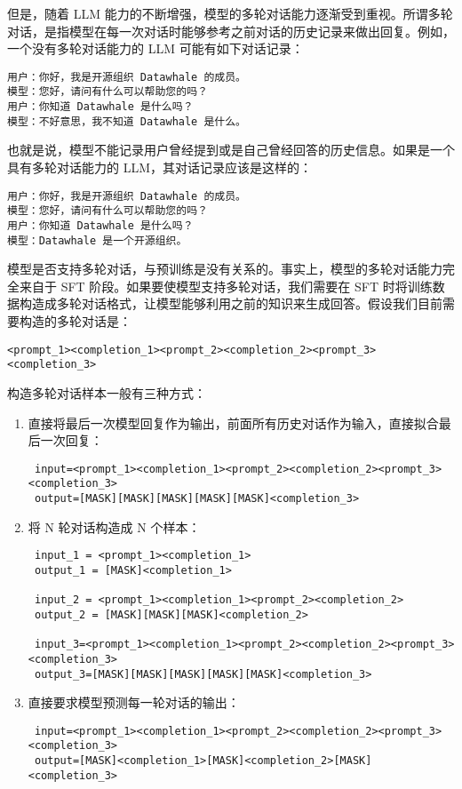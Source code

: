 \documentclass[12pt,a4paper]{book}
\begin{document}
但是，随着 LLM
能力的不断增强，模型的多轮对话能力逐渐受到重视。所谓多轮对话，是指模型在每一次对话时能够参考之前对话的历史记录来做出回复。例如，一个没有多轮对话能力的
LLM 可能有如下对话记录：

\begin{verbatim}
用户：你好，我是开源组织 Datawhale 的成员。
模型：您好，请问有什么可以帮助您的吗？
用户：你知道 Datawhale 是什么吗？
模型：不好意思，我不知道 Datawhale 是什么。
\end{verbatim}

也就是说，模型不能记录用户曾经提到或是自己曾经回答的历史信息。如果是一个具有多轮对话能力的
LLM，其对话记录应该是这样的：

\begin{verbatim}
用户：你好，我是开源组织 Datawhale 的成员。
模型：您好，请问有什么可以帮助您的吗？
用户：你知道 Datawhale 是什么吗？
模型：Datawhale 是一个开源组织。
\end{verbatim}

模型是否支持多轮对话，与预训练是没有关系的。事实上，模型的多轮对话能力完全来自于
SFT 阶段。如果要使模型支持多轮对话，我们需要在 SFT
时将训练数据构造成多轮对话格式，让模型能够利用之前的知识来生成回答。假设我们目前需要构造的多轮对话是：

\begin{verbatim}
<prompt_1><completion_1><prompt_2><completion_2><prompt_3><completion_3>
\end{verbatim}

构造多轮对话样本一般有三种方式：

\begin{enumerate}
\def\labelenumi{\arabic{enumi}.}
\item
  直接将最后一次模型回复作为输出，前面所有历史对话作为输入，直接拟合最后一次回复：

\begin{verbatim}
 input=<prompt_1><completion_1><prompt_2><completion_2><prompt_3><completion_3>
 output=[MASK][MASK][MASK][MASK][MASK]<completion_3>
\end{verbatim}
\item
  将 N 轮对话构造成 N 个样本：

\begin{verbatim}
 input_1 = <prompt_1><completion_1>
 output_1 = [MASK]<completion_1>

 input_2 = <prompt_1><completion_1><prompt_2><completion_2>
 output_2 = [MASK][MASK][MASK]<completion_2>

 input_3=<prompt_1><completion_1><prompt_2><completion_2><prompt_3><completion_3>
 output_3=[MASK][MASK][MASK][MASK][MASK]<completion_3>
\end{verbatim}
\item
  直接要求模型预测每一轮对话的输出：

\begin{verbatim}
 input=<prompt_1><completion_1><prompt_2><completion_2><prompt_3><completion_3>
 output=[MASK]<completion_1>[MASK]<completion_2>[MASK]<completion_3>
\end{verbatim}
\end{enumerate}
\end{document}
